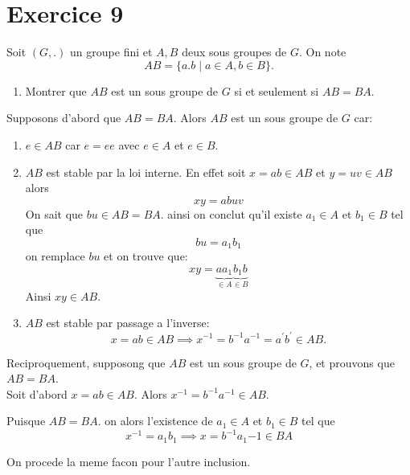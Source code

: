 \documentclass{report}
\begin{document}
\section{Exercice 9}
{
Soit $\left(G, .\right)$ un groupe fini et $A,B$ deux sous groupes de $G$. On
note
\begin{equation*}
  AB = \{a.b\;|\; a\in A, b\in B\}.
\end{equation*}

\begin{enumerate}
  \item Montrer  que $AB$ est un sous groupe de $G$ si et seulement si $AB =
    BA$.
\end{enumerate}
}
\begin{myproof}
  Supposons d'abord que $AB = BA$. Alors $AB$ est un sous groupe de $G$ car:

  \begin{enumerate}
    \item $e \in AB$ car $e= ee$ avec $e \in A$ et $e \in B$.
    \item $AB$ est stable par la loi interne. En effet soit $x=ab \in AB$ et $y = uv \in AB$ alors 
      $$
      xy = abuv
      $$
  On sait que $bu \in AB = BA$. ainsi on conclut qu'il existe $a_1 \in A$ et $b_1 \in B$ tel que
  $$
  bu = a_1 b_1
  $$
  on remplace $bu$ et on trouve que:
  $$
  xy = \underbrace{aa_1}_{\in A} \underbrace{b_1b}_{\in B}
  $$
  Ainsi $xy \in AB$.

\item $AB$ est stable par passage a l'inverse:
  $$
  x = ab \in AB \implies x^{-1} = b^{-1}a^{-1} = a^{'}b^{'}\in AB.
  $$
  \end{enumerate}
  Reciproquement, supposong que $AB$ est un sous groupe de $G$, et prouvons que $AB = BA$.\\

  Soit d'abord $x = ab \in AB$. Alors $x^{-1} = b^{-1}a^{-1} \in AB$.

  Puisque $AB = BA$. on alors l'existence de $a_1\in A$ et $b_1 \in B$ tel que 
  $$
  x^{-1} = a_1 b_1 \implies x = b^{-1} a_1{-1} \in BA
  $$

  On procede la meme facon pour l'autre inclusion.

\end{myproof}
\end{document}
